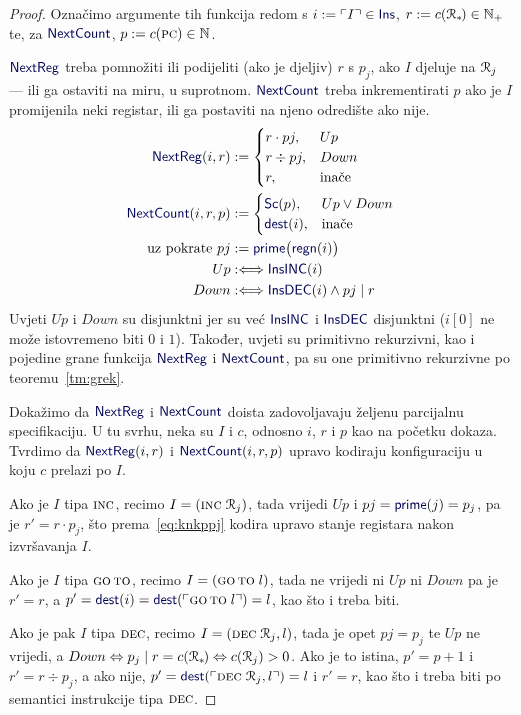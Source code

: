 \begin{proof}
	Označimo argumente tih funkcija redom s $i:=\kins{I}\in\f{Ins}$, $r:=c(\mathcal R_{*}\mspace{-2mu})\in{\mathbb N}_+$ te, za $\f{NextCount}$, $p:=c(\textsc{pc})\in{\mathbb N}$.

$\f{NextReg}$ treba pomnožiti ili podijeliti (ako je djeljiv) $r$ s $p_j$, ako $I$ djeluje na $\mathcal R_{j}$ --- ili ga ostaviti na miru, u suprotnom. $\f{NextCount}$ treba inkrementirati $p$ ako je $I$ promijenila neki registar, ili ga postaviti na njeno odredište ako nije.
\begin{align}
    \label{eq:NextRegdef}\f{NextReg}(i,r)&:=\begin{cases}
    r\cdot pj,&Up\\
    r\div pj,&Down\\
    r,&\text{inače}
    \end{cases}%
\\
    \f{NextCount}(i,r,p)&:=\begin{cases}
    \f{Sc}(p),&Up\lor Down\\
    \f{dest}(i),&\text{inače}
    \end{cases}%
\\
\text{uz pokrate }
pj&:=\f{prime}\bigl(\f{regn}(i)\bigr)%
\\
Up&:\Longleftrightarrow\f{InsINC}(i)%
\\
Down&:\Longleftrightarrow\f{InsDEC}(i)\land pj\mid r%
\end{align}
Uvjeti $Up$ i $Down$ su disjunktni jer su već $\f{InsINC}$ i $\f{InsDEC}$ disjunktni ($i[0]$ ne može istovremeno biti $0$ i $1$). Također, uvjeti su primitivno rekurzivni, kao i pojedine grane funkcija $\f{NextReg}$ i $\f{NextCount}$, pa su one primitivno rekurzivne po teoremu~\ref{tm:grek}.

Dokažimo da $\f{NextReg}$ i $\f{NextCount}$ doista zadovoljavaju željenu parcijalnu specifikaciju. U tu svrhu, neka su $I$ i $c$, odnosno $i$, $r$ i $p$ kao na početku dokaza. Tvrdimo da $\f{NextReg}(i,r)$ i $\f{NextCount}(i,r,p)$ upravo kodiraju konfiguraciju u koju $c$ prelazi po $I$.

Ako je $I$ tipa $\textsc{inc}$, recimo $I=(\textsc{inc}\;\mathcal R_{j})$, tada vrijedi $Up$ i $pj=\f{prime}(j)=p_j$, pa je $r'=r\cdot p_j$, što prema~\eqref{eq:knkppj} kodira upravo stanje registara nakon izvršavanja $I$.

Ako je $I$ tipa $\textsc{go\,to}$, recimo $I=(\textsc{go\,to}\;l)$, tada ne vrijedi ni $Up$ ni $Down$ pa je $r'=r$, a $p'=\f{dest}(i)=\f{dest}(\kins{\goto\;l})=l$, kao što i treba biti.

	Ako je pak $I$ tipa $\textsc{dec}$, recimo $I=(\textsc{dec}\;\mathcal R_{j},l)$, tada je opet $pj=p_j$ te $Up$ ne vrijedi, a $Down\Leftrightarrow p_j\mid r=c(\mathcal R_{*}\mspace{-2mu})\Leftrightarrow c(\mathcal R_{j})>0$. Ako je to istina, $p'=p+1$ i $r'=r\div p_j$, a ako nije, $p'=\f{dest}(\kins{\decr jl})=l$ i $r'=r$, kao što i treba biti po semantici instrukcije tipa $\textsc{dec}$.
\end{proof}

